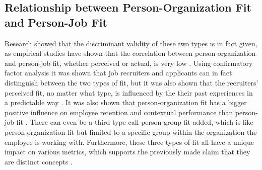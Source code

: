 \documentclass[draft,final]{thesisclass} %
\begin{document}
\subsection{Relationship between Person-Organization Fit and Person-Job Fit}
Research showed that the discriminant validity of these two types is in fact given, as empirical studies have shown that the correlation between person-organization and person-job fit, whether perceived or actual, is very low \cite[185]{po_and_pj_fit_literature_review}.
Using confirmatory factor analysis it was shown that job recruiters and applicants can in fact distinguish between the two types of fit, but it was also shown that the recruiters' perceived fit, no matter what type, is influenced by the their past experiences in a predictable way \cite[185]{po_and_pj_fit_literature_review}.
It was also shown that person-organization fit has a bigger positive influence on employee retention and contextual performance than person-job fit \cite[185]{po_and_pj_fit_literature_review}.
There can even be a third type call person-group fit added, which is like person-organization fit but limited to a specific group within the organization the employee is working with.
Furthermore, these three types of fit all have a unique impact on various metrics, which supports the previously made claim that they are distinct concepts \cite[185]{po_and_pj_fit_literature_review}.
\end{document}
